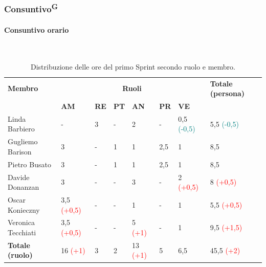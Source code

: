\documentclass[8pt]{article}
\newcommand{\glossterm}[1]{#1\textsuperscript{G}} %
\newcommand{\subsubsubsection}[1]{\paragraph{#1}\mbox{}\\}
\begin{document}
\subsubsection{\glossterm{Consuntivo}}
\subsubsubsection{Consuntivo orario}
\begin{table}[ht!]
	\centering
    \begin{tabular}{p{4cm}*{6}{l}p{3cm}}
		\toprule
        \textbf{Membro} & \multicolumn{6}{c}{\textbf{Ruoli}} & \textbf{Totale
        (persona)}\\
		& \textbf{AM} & \textbf{RE} & \textbf{PT} & \textbf{AN} & \textbf{PR} & \textbf{VE}\\
		\midrule
        Linda Barbiero & - & 3 & - & 2 & - & 0,5 \textcolor{teal}{(-0,5)} & 5,5 \textcolor{teal}{(-0,5)} \\ 
        Gugliemo Barison & 3 & - & 1 & 1 & 2,5 & 1 & 8,5 \\ 
        Pietro Busato & 3 & - & 1 & 1 & 2,5 & 1 & 8,5 \\ 
        Davide Donanzan & 3 & - & - & 3 & - & 2 \textcolor{red}{(+0,5)} & 8 \textcolor{red}{(+0,5)} \\ 
        Oscar Konieczny & 3,5 \textcolor{red}{(+0,5)} & - & - & 1 & - & 1 & 5,5 \textcolor{red}{(+0,5)} \\ 
        Veronica Tecchiati & 3,5 \textcolor{red}{(+0,5)} & - & - & 5 \textcolor{red}{(+1)} & - & 1 & 9,5 \textcolor{red}{(+1,5)} \\ 
        \midrule
        \textbf{Totale (ruolo)} & 16 \textcolor{red}{(+1)} & 3 & 2 & 13 \textcolor{red}{(+1)} & 5 & 6,5 & 45,5 \textcolor{red}{(+2)} \\
	\bottomrule
	\end{tabular}
	\caption{Distribuzione delle ore del primo Sprint secondo ruolo e membro.}
	\label{table:Distribuzione delle ore consuntive del primo Sprint secondo ruolo e membro}
\end{table}
\end{document}
